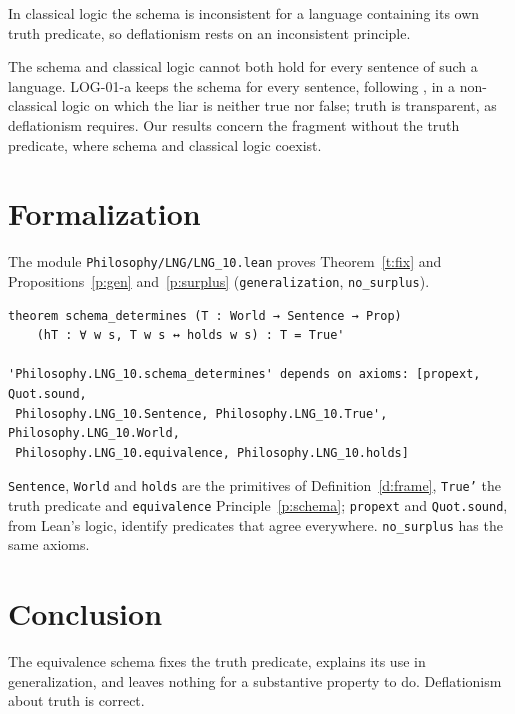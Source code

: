 \documentclass{situationist-preprint}
\begin{document}
\begin{objection}
In classical logic the schema is inconsistent for a language containing its own truth predicate, so deflationism rests on an inconsistent principle.
\end{objection}

\begin{reply}
The schema and classical logic cannot both hold for every sentence of such a language. LOG-01-a keeps the schema for every sentence, following \citet{Field2008}, in a non-classical logic on which the liar is neither true nor false; truth is transparent, as deflationism requires. Our results concern the fragment without the truth predicate, where schema and classical logic coexist.
\end{reply}

\section{Formalization}

The module \nolinkurl{Philosophy/LNG/LNG_10.lean} proves Theorem~\ref{t:fix} and Propositions~\ref{p:gen} and~\ref{p:surplus} (\texttt{generalization}, \texttt{no\_surplus}).

\begin{lstlisting}
theorem schema_determines (T : World → Sentence → Prop)
    (hT : ∀ w s, T w s ↔ holds w s) : T = True'

'Philosophy.LNG_10.schema_determines' depends on axioms: [propext, Quot.sound,
 Philosophy.LNG_10.Sentence, Philosophy.LNG_10.True', Philosophy.LNG_10.World,
 Philosophy.LNG_10.equivalence, Philosophy.LNG_10.holds]
\end{lstlisting}

\texttt{Sentence}, \texttt{World} and \texttt{holds} are the primitives of Definition~\ref{d:frame}, \texttt{True'} the truth predicate and \texttt{equivalence} Principle~\ref{p:schema}; \texttt{propext} and \texttt{Quot.sound}, from Lean's logic, identify predicates that agree everywhere. \texttt{no\_surplus} has the same axioms.

\section{Conclusion}

The equivalence schema fixes the truth predicate, explains its use in generalization, and leaves nothing for a substantive property to do. Deflationism about truth is correct.
\end{document}

